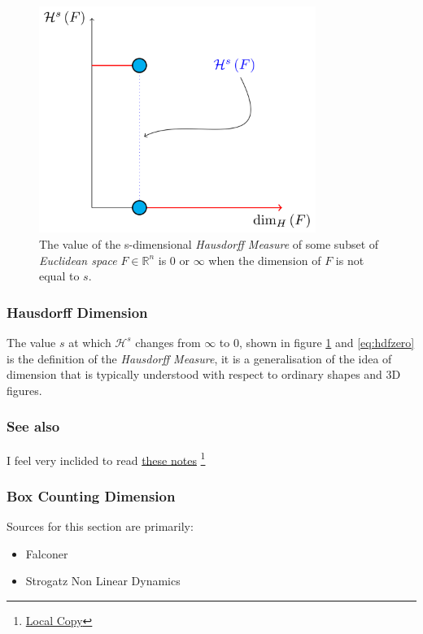 \documentclass[11pt]{article}
\begin{document}
\begin{figure}[htbp]
\centering
\includegraphics[width=9cm]{media/tikz/hausdorff-dimension-plot.png}
\caption{\label{hausdorff-vals}The value of the s-dimensional \emph{Hausdorff Measure} of some subset of \emph{Euclidean space} \(F\in \mathbb{R}^{n}\) is 0 or \(\infty\) when the dimension of \(F\) is not equal to \(s\).}
\end{figure}

\subsubsection{Hausdorff Dimension}
\label{sec:org342ba9f}


The value \(s\) at which \(\mathcal{H}^{s}\) changes from \(\infty\) to 0, shown in figure \ref{hausdorff-vals}  and \eqref{eq:hdfzero} is the definition of the \emph{Hausdorff Measure}, it is a generalisation of the idea of dimension that is typically understood with respect to ordinary shapes and 3D figures.
\subsubsection{See also}
\label{sec:orgffc2de5}
I feel very inclided to read \href{https://warwick.ac.uk/fac/sci/maths/people/staff/mark\_pollicott/p3/tehran.pdf}{these notes} \footnote{\href{file:///home/ryan/Dropbox/Studies/2020Spring/QuantProject/Current/Python-Quant/Resources/Uncorrected-Warwick-BoxCount-Hausendorff-Notes.pdf}{Local Copy}}

\subsubsection{Box Counting Dimension}
\label{sec:org187fb33}
Sources for this section are primarily:
\begin{itemize}
\item Falconer \cite[Ch. 3.1]{falconerFractalGeometryMathematical2003b}
\item Strogatz Non Linear Dynamics \cite[Ch. 11.4]{strogatzNonlinearDynamicsChaos2015}
\end{itemize}
\end{document}
